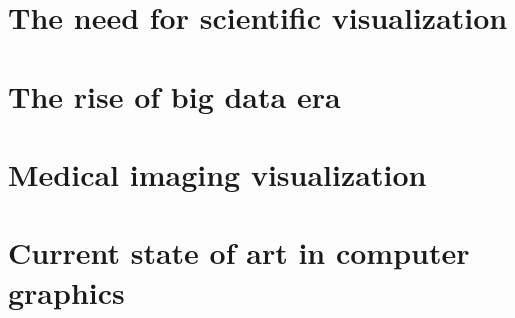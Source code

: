 
\chapter{The need for scientific visualization}\label{Chapter11} %
\thispagestyle{empty}

\chapter{The rise of big data era}\label{Chapter12} %
\thispagestyle{empty}

\chapter{Medical imaging visualization}\label{Chapter13} %
\thispagestyle{empty}

\chapter{Current state of art in computer graphics}\label{Chapter14} %
\thispagestyle{empty}
